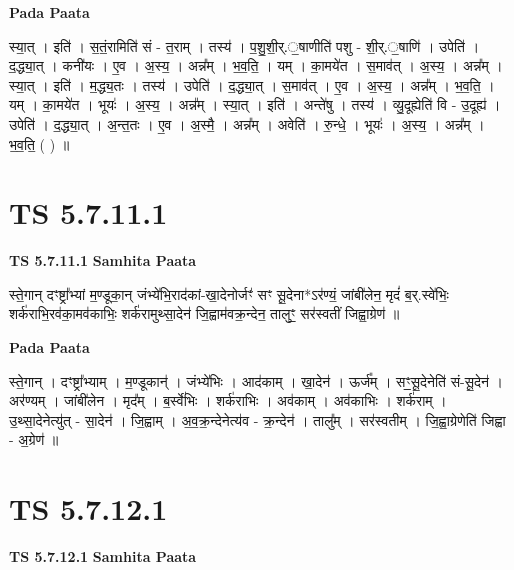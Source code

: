 \documentclass[17pt]{extarticle}
\begin{document}
\textbf{Pada Paata} \newline

स्या॒त् । इति॑ । स॒तं॒रामिति॑ सं - त॒राम् । तस्य॑ । प॒शु॒शी॒र्.॒षाणीति॑ पशु - शी॒र्.॒षाणि॑ । उपेति॑ । द॒द्ध्या॒त् । कनी॑यः । ए॒व । अ॒स्य॒ । अन्न᳚म् । भ॒व॒ति॒ । यम् । का॒मये॑त । स॒माव॑त् । अ॒स्य॒ । अन्न᳚म् । स्या॒त् । इति॑ । म॒द्ध्य॒तः । तस्य॑ । उपेति॑ । द॒द्ध्या॒त् । स॒माव॑त् । ए॒व । अ॒स्य॒ । अन्न᳚म् । भ॒व॒ति॒ । यम् । का॒मये॑त । भूयः॑ । अ॒स्य॒ । अन्न᳚म् । स्या॒त् । इति॑ । अन्ते॑षु । तस्य॑ । व्यु॒दूह्येति॑ वि - उ॒दूह्य॑ । उपेति॑ । द॒द्ध्या॒त् । अ॒न्त॒तः । ए॒व । अ॒स्मै॒ । अन्न᳚म् । अवेति॑ । रु॒न्धे॒ । भूयः॑ । अ॒स्य॒ । अन्न᳚म् । भ॒व॒ति॒ ( ) ॥  \newline





\section{ TS 5.7.11.1 }

\textbf{TS 5.7.11.1 } \newline
\textbf{Samhita Paata} \newline

स्ते॒गान् दꣳष्ट्रा᳚भ्यां म॒ण्डूका॒न् जंभ्ये॑भि॒राद॑कां-खा॒देनोर्जꣳ॑ सꣳ सू॒देना*ऽर॑ण्यं॒ जांबी॑लेन॒ मृदं॑ ब॒र्.स्वे॑भिः॒ शर्क॑राभि॒रव॑का॒मव॑काभिः॒ शर्क॑रामुथ्सा॒देन॑ जि॒ह्वाम॑वक्र॒न्देन॒ तालुꣳ॒॒ सर॑स्वतीं जिह्वा॒ग्रेण॑ ॥ \newline

\textbf{Pada Paata} \newline

स्ते॒गान् । दꣳष्ट्रा᳚भ्याम् । म॒ण्डूकान्॑ । जंभ्ये॑भिः । आद॑काम् । खा॒देन॑ । ऊर्ज᳚म् । सꣳ॒॒सू॒देनेति॑ सं-सू॒देन॑ । अर॑ण्यम् । जांबी॑लेन । मृद᳚म् । ब॒र्स्वे॑भिः । शर्क॑राभिः । अव॑काम् । अव॑काभिः । शर्क॑राम् । उ॒थ्सा॒देनेत्यु॑त् - सा॒देन॑ । जि॒ह्वाम् । अ॒व॒क्र॒न्देनेत्य॑व - क्र॒न्देन॑ । तालु᳚म् । सर॑स्वतीम् । जि॒ह्वा॒ग्रेणेति॑ जिह्वा - अ॒ग्रेण॑ ॥  \newline





\section{ TS 5.7.12.1 }

\textbf{TS 5.7.12.1 } \newline
\textbf{Samhita Paata} \newline
\end{document}

